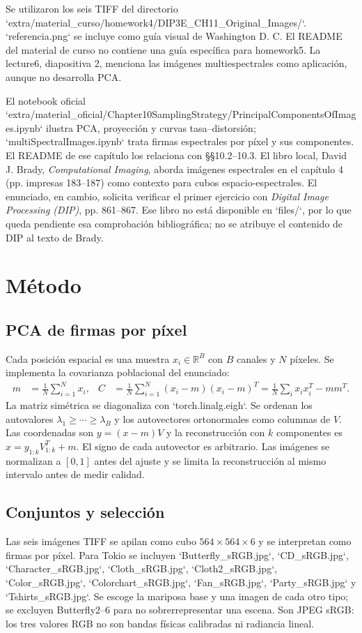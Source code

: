 \documentclass[11pt,a4paper]{article}
\begin{document}
Se utilizaron los seis TIFF del directorio `extra/material\_curso/homework4/DIP3E\_CH11\_Original\_Images/`. `referencia.png` se incluye como guía visual de Washington D. C. El README del material de curso no contiene una guía específica para homework5. La lecture6, diapositiva 2, menciona las imágenes multiespectrales como aplicación, aunque no desarrolla PCA.

El notebook oficial `extra/material\_oficial/Chapter10SamplingStrategy/PrincipalComponentsOfImages.ipynb` ilustra PCA, proyección y curvas tasa--distorsión; `multiSpectralImages.ipynb` trata firmas espectrales por píxel y sus componentes. El README de ese capítulo los relaciona con §§10.2--10.3. El libro local, David J. Brady, \emph{Computational Imaging}, aborda imágenes espectrales en el capítulo 4 (pp. impresas 183--187) como contexto para cubos espacio-espectrales. El enunciado, en cambio, solicita verificar el primer ejercicio con \emph{Digital Image Processing (DIP)}, pp. 861--867. Ese libro no está disponible en `files/`, por lo que queda pendiente esa comprobación bibliográfica; no se atribuye el contenido de DIP al texto de Brady.

\section{Método}
\subsection{PCA de firmas por píxel}
Cada posición espacial es una muestra $x_i\in\mathbb{R}^{B}$ con $B$ canales y $N$ píxeles. Se implementa la covarianza poblacional del enunciado:
\begin{align}
m&=\frac{1}{N}\sum_{i=1}^N x_i,&
C&=\frac{1}{N}\sum_{i=1}^N(x_i-m)(x_i-m)^T
=\frac{1}{N}\sum_i x_ix_i^T-mm^T.\label{eq:cov}
\end{align}
La matriz simétrica se diagonaliza con `torch.linalg.eigh`. Se ordenan los autovalores $\lambda_1\ge\cdots\ge\lambda_B$ y los autovectores ortonormales como columnas de $V$. Las coordenadas son $y=(x-m)V$ y la reconstrucción con $k$ componentes es $\hat{x}=y_{1:k}V_{1:k}^T+m$. El signo de cada autovector es arbitrario. Las imágenes se normalizan a $[0,1]$ antes del ajuste y se limita la reconstrucción al mismo intervalo antes de medir calidad.

\subsection{Conjuntos y selección}
Las seis imágenes TIFF se apilan como cubo $564\times564\times6$ y se interpretan como firmas por píxel. Para Tokio se incluyen `Butterfly\_sRGB.jpg`, `CD\_sRGB.jpg`, `Character\_sRGB.jpg`, `Cloth\_sRGB.jpg`, `Cloth2\_sRGB.jpg`, `Color\_sRGB.jpg`, `Colorchart\_sRGB.jpg`, `Fan\_sRGB.jpg`, `Party\_sRGB.jpg` y `Tshirts\_sRGB.jpg`. Se escoge la mariposa base y una imagen de cada otro tipo; se excluyen Butterfly2--6 para no sobrerrepresentar una escena. Son JPEG sRGB: los tres valores RGB no son bandas físicas calibradas ni radiancia lineal.
\end{document}
